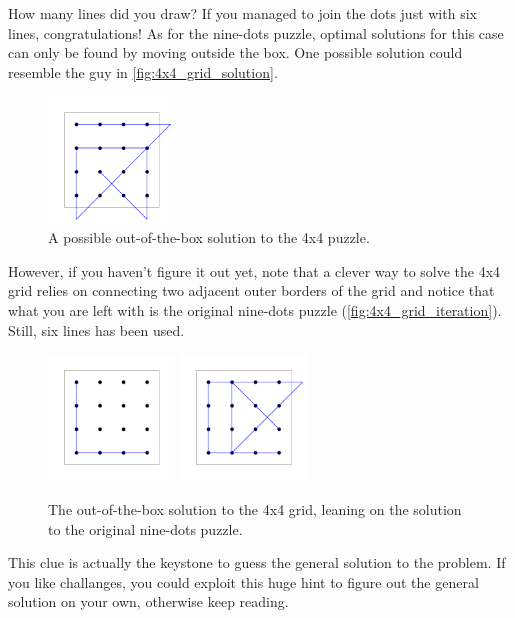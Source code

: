 \documentclass[11pt]{article}
\begin{document}
How many lines did you draw? If you managed to join the dots just with six lines, congratulations! As for the nine-dots puzzle, optimal solutions for this case can only be found by moving outside the box. One possible solution could resemble the guy in \autoref{fig:4x4_grid_solution}.
\begin{figure}[H]
\centering
\includegraphics[width=0.3\textwidth]{images/4x4_grid_solution.png}
\caption{A possible out-of-the-box solution to the 4x4 puzzle.}
\label{fig:4x4_grid_solution}
\end{figure}
However, if you haven't figure it out yet, note that a clever way to solve the 4x4 grid relies on connecting two adjacent outer borders of the grid and notice that what you are left with is the original nine-dots puzzle (\autoref{fig:4x4_grid_iteration}). Still, six lines has been used.
\begin{figure}[H]
\centering
\includegraphics[width=0.3\textwidth]{images/4x4_grid_iteration.png}
\includegraphics[width=0.3\textwidth]{images/4x4_grid_iteration_solution.png}
\caption{The out-of-the-box solution to the 4x4 grid, leaning on the solution to the original nine-dots puzzle.}
\label{fig:4x4_grid_iteration}
\end{figure}
This clue is actually the keystone to guess the general solution to the problem. If you like challanges, you could exploit this huge hint to figure out the general solution on your own, otherwise keep reading.\\
\end{document}
